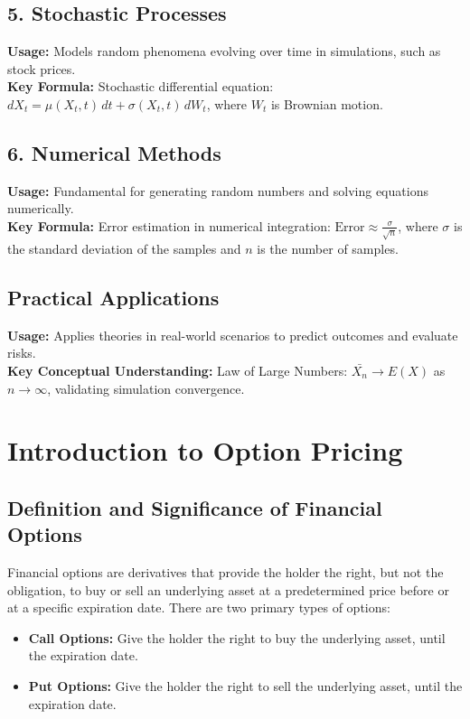 \documentclass{article}
\begin{document}
\subsection*{5. Stochastic Processes}
\textbf{Usage:} Models random phenomena evolving over time in simulations, such as stock prices.\\
\textbf{Key Formula:} Stochastic differential equation: \( dX_t = \mu(X_t, t) \, dt + \sigma(X_t, t) \, dW_t \), where \( W_t \) is Brownian motion.

\subsection*{6. Numerical Methods}
\textbf{Usage:} Fundamental for generating random numbers and solving equations numerically.\\
\textbf{Key Formula:} Error estimation in numerical integration: \( \text{Error} \approx \frac{\sigma}{\sqrt{n}} \), where \( \sigma \) is the standard deviation of the samples and \( n \) is the number of samples.



\subsection*{Practical Applications}
\textbf{Usage:} Applies theories in real-world scenarios to predict outcomes and evaluate risks.\\
\textbf{Key Conceptual Understanding:} Law of Large Numbers: \( \bar{X_n} \to E(X) \) as \( n \to \infty \), validating simulation convergence.



\newpage

\section{Introduction to Option Pricing}

\subsection*{Definition and Significance of Financial Options}
Financial options are derivatives that provide the holder the right, but not the obligation, to buy or sell an underlying asset at a predetermined price before or at a specific expiration date. There are two primary types of options:

\begin{itemize}
    \item \textbf{Call Options:} Give the holder the right to buy the underlying asset, until the expiration date.
    \item \textbf{Put Options:} Give the holder the right to sell the underlying asset, until the expiration date.
\end{itemize}
\end{document}
